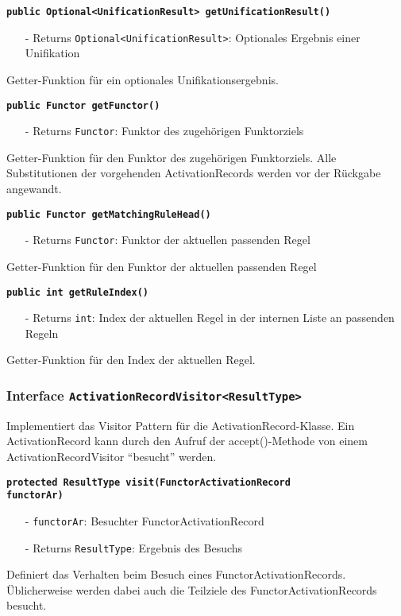 \documentclass[parskip=full,11pt,twoside]{scrartcl}
\begin{document}
\textbf{\texttt{public Optional<UnificationResult> getUnificationResult()}}
\begin{itemize}[noitemsep]
	\item[-] Returns \texttt{Optional<UnificationResult>}: Optionales Ergebnis einer Unifikation
\end{itemize}
Getter-Funktion für ein optionales Unifikationsergebnis.

\textbf{\texttt{public Functor getFunctor()}}
\begin{itemize}[noitemsep]
	\item[-] Returns \texttt{Functor}: Funktor des zugehörigen Funktorziels
\end{itemize}
Getter-Funktion für den Funktor des zugehörigen Funktorziels. Alle Substitutionen der vorgehenden ActivationRecords werden vor der Rückgabe angewandt. 

\textbf{\texttt{public Functor getMatchingRuleHead()}}
\begin{itemize}[noitemsep]
	\item[-] Returns \texttt{Functor}: Funktor der aktuellen passenden Regel
\end{itemize}
Getter-Funktion für den Funktor der aktuellen passenden Regel

\textbf{\texttt{public int getRuleIndex()}}
\begin{itemize}[noitemsep]
	\item[-] Returns \texttt{int}: Index der aktuellen Regel in der internen Liste an passenden Regeln 
\end{itemize}
Getter-Funktion für den Index der aktuellen Regel.

\subsubsection{Interface \texttt{ActivationRecordVisitor<ResultType>}}

Implementiert das Visitor Pattern für die ActivationRecord-Klasse. Ein ActivationRecord kann durch den Aufruf der accept()-Methode von einem ActivationRecordVisitor \enquote{besucht} werden.

\textbf{\texttt{protected ResultType visit(FunctorActivationRecord\\functorAr)}}
\begin{itemize}[noitemsep]
	\item[-] \texttt{functorAr}: Besuchter FunctorActivationRecord
	\item[-] Returns \texttt{ResultType}: Ergebnis des Besuchs
\end{itemize}
Definiert das Verhalten beim Besuch eines FunctorActivationRecords. Üblicherweise werden dabei auch die Teilziele des FunctorActivationRecords besucht.
\end{document}
